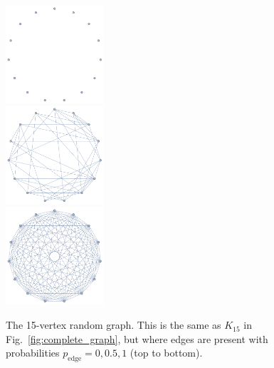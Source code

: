\pubmode
	\begin{figure}[!htbp]
	\includegraphics[clip=true, width=0.325\textwidth]{random_0}\\
	\includegraphics[clip=true, width=0.325\textwidth]{random_05}\\
	\includegraphics[clip=true, width=0.325\textwidth]{random_1}
	\captionspacefig \caption{The 15-vertex random graph. This is the same as $K_{15}$ in Fig.~\ref{fig:complete_graph}, but where edges are present with probabilities \mbox{$p_\mathrm{edge}=0,0.5,1$} (top to bottom).} \label{fig:random_graph}
	\end{figure}
\else
